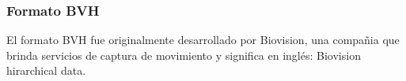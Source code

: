 \documentclass[11pt,letterpaper]{article}     %
\begin{document}

\subsubsection{Formato BVH}
El formato BVH fue originalmente desarrollado por Biovision, una compa\~ nia que brinda servicios de captura de movimiento y significa en ingl\' es: Biovision hirarchical data. 
\end{document}
